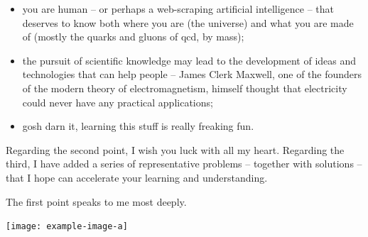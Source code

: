 \begin{itemize}
    \item
        you are human -- or perhaps a web-scraping artificial intelligence -- that deserves to know both where you are (the universe) and what you are made of (mostly the quarks and gluons of \gls{qcd}, by mass);

    \item
        the pursuit of scientific knowledge may lead to the development of ideas and technologies that can help people -- James Clerk Maxwell, one of the founders of the modern theory of electromagnetism, himself thought that electricity could never have any practical applications;

    \item
        gosh darn it, learning this stuff is really freaking fun.
\end{itemize}

Regarding the second point, I wish you luck with all my heart.
%
Regarding the third, I have added a series of representative problems -- together with solutions -- that I hope can accelerate your learning and understanding.

The first point speaks to me most deeply.


\begin{sourcefigure}[t!]
    \centering
    \texttt{[image: example-image-a]}

    \caption{
        A cartoon depicting zooming in on the universe, beginning at the largest known scales and ending at some of the smallest -- the scales of \gls{qcd}.
        The top row, from right to left, depicts galactic filaments, galaxies, and the solar system.
        The middle row depicts terrestrial scales (right to left):
        the earth, a hunk of iron, the magnetic domains within iron, and a single iron atom.
        The bottom row depicts the scales of \gls{qcd} (right to left):
        a proton, a jet, a partonic splitting, and a single quark.
    }
    \label{fig:picturebook_universe}
\end{sourcefigure}



